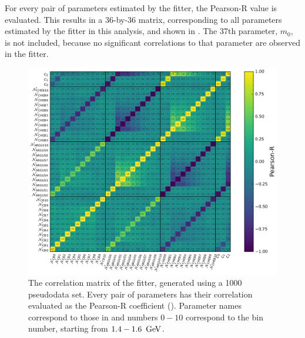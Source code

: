 For every pair of parameters estimated by the \Mbc fitter, the Pearson-R value is evaluated.
This results in a 36-by-36 matrix, corresponding to all parameters estimated by the \Mbc fitter in this analysis, and shown in .
The 37th parameter, $m_0$, is not included, because no significant correlations to that parameter are observed in the fitter.
\begin{figure}[htbp!]
    \includegraphics[width=1\textwidth]{figures/mc_validation/correlation_matrix.pdf}
    \caption{\label{fig:correlation_matrix}The correlation matrix of the \Mbc fitter, generated using a 1000 pseudodata set.
    Every pair of parameters has their correlation evaluated as the Pearson-R coefficient ().
    Parameter names correspond to those in  and numbers $0-10$ correspond to the bin number, starting from $1.4-1.6~\mathrm{\,Ge\kern -0.1em V}$.
    }
\end{figure}

